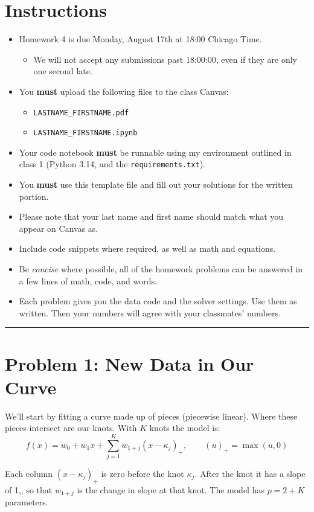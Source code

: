 \documentclass[11pt, letterpaper]{article}
\newcommand{\problem}[1]{\section*{Problem #1}}
\begin{document}
\section*{Instructions}
\begin{itemize}
    \item Homework 4 is due Monday, August 17th at 18:00 Chicago Time.
    \begin{itemize}
        \item We will not accept any submissions past 18:00:00, even if they are only one second late.
    \end{itemize}
    \item You \textbf{must} upload the following files to the class Canvas:
    \begin{itemize}
        \item \texttt{LASTNAME\_FIRSTNAME.pdf}
        \item \texttt{LASTNAME\_FIRSTNAME.ipynb}
    \end{itemize}
    \item Your code notebook \textbf{must} be runnable using my environment outlined in class 1 (Python 3.14, and the \texttt{requirements.txt}).
    \item You \textbf{must} use this template file and fill out your solutions for the written portion.
    \item Please note that your last name and first name should match what you appear on Canvas as.
    \item Include code snippets where required, as well as math and equations.
    \item Be \textit{concise} where possible, all of the homework problems can be answered in a few lines of math, code, and words.
    \item Each problem gives you the data code and the solver settings. Use them as written. Then your numbers will agree with your classmates' numbers.
\end{itemize}
\hrule
\vspace{0.5cm}

\pagebreak

\problem{1: New Data in Our Curve}

We'll start by fitting a curve made up of pieces (piecewise linear). Where these pieces intersect are our knots. With $K$ knots the model is:
$$
f(x) = w_0 + w_1 x + \sum_{j=1}^{K} w_{1+j} (x - \kappa_j)_{+},
\qquad (u)_{+} = \max(u, 0)
$$

Each column $(x - \kappa_j)_+$ is zero before the knot $\kappa_j$. After the knot it has a slope of 1,, so that $w_{1+j}$ is the change in slope at that knot. The model has $p = 2 + K$ parameters.
\end{document}
